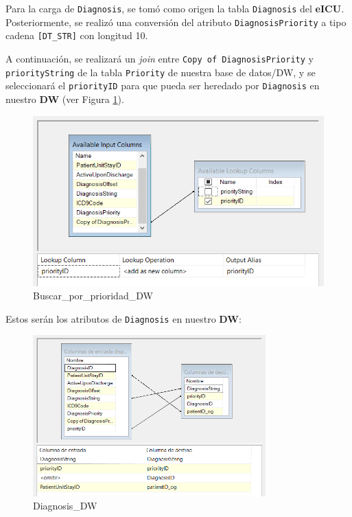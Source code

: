 \documentclass[12pt, a4paper, twoside]{article}
\begin{document}
	Para la carga de \texttt{Diagnosis}, se tomó como origen la tabla \texttt{Diagnosis} del \textbf{eICU}. Posteriormente, se realizó una conversión del atributo \texttt{DiagnosisPriority} a tipo cadena \texttt{[DT\_STR]} con longitud 10.
	
	A continuación, se realizará un \textit{join} entre \texttt{Copy of DiagnosisPriority} y \texttt{priorityString} de la tabla \texttt{Priority} de nuestra base de datos/DW, y se seleccionará el \texttt{priorityID} para que pueda ser heredado por \texttt{Diagnosis} en nuestro \textbf{DW} (ver Figura \ref{fig:29}).
	
	\begin{figure}[H]
		\centering
		\includegraphics[width=1\textwidth]{image/112_carga_diagnosis_lookup.png}
		\caption{Buscar\_por\_prioridad\_DW}
		\label{fig:29}
	\end{figure}
	
	Estos serán los atributos de \texttt{Diagnosis} en nuestro \textbf{DW}:
	
	\begin{figure}[H]
		\centering
		\includegraphics[width=0.8\textwidth]{image/112_carga_diagnosis_destino.png}
		\caption{Diagnosis\_DW}
		\label{fig:30}
	\end{figure}
\end{document}
